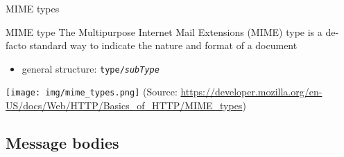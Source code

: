 \documentclass[presentation]{beamer}\mode<presentation>{\usetheme{AMSBolognaFC}}
\begin{document}
\begin{frame}[allowframebreaks]{MIME types}

    \begin{block}{MIME type}
        The \alert{Multipurpose Internet Mail Extensions} (MIME) type is a de-facto standard way to indicate the nature and format of a document
        \begin{itemize}\small
            \item general structure: \alert{\texttt{type/\textit{subType}}}
        \end{itemize}
    \end{block}

    \framebreak

    \begin{center}
        \texttt{[image: img/mime\_types.png]}
        \small
        (Source: \url{https://developer.mozilla.org/en-US/docs/Web/HTTP/Basics_of_HTTP/MIME_types})
    \end{center}

\end{frame}

\subsection{Message bodies}
\end{document}
